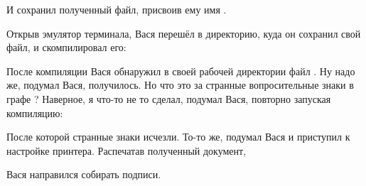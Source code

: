 
И сохранил полученный файл, присвоив ему имя .

Открыв эмулятор терминала, Вася перешёл в директорию, куда он сохранил свой
файл, и скомпилировал его:


После компиляции Вася обнаружил в своей рабочей директории файл
. Ну надо же, подумал Вася, получилось. Но что это за странные
вопросительные знаки в графе ? Наверное, я что-то не то сделал,
подумал Вася, повторно запуская компиляцию:


После которой странные знаки исчезли. То-то же, подумал Вася и приступил к
настройке принтера. Распечатав полученный документ,

\begin{center}
\end{center}

Вася направился собирать подписи.
